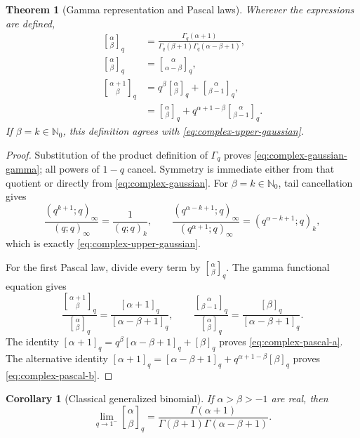 \documentclass[11pt,oneside,openany]{book}
\newtheorem{theorem}{Theorem}[chapter]
\newtheorem{corollary}[corollary]{Corollary}
\theoremstyle{definition}
\theoremstyle{remark}
\newcommand{\N}{\mathbb N}
\begin{document}
\begin{theorem}[Gamma representation and Pascal laws]\label{thm:complex-gaussian-properties}
Wherever the expressions are defined,
\begin{align}
 \genfrac{[}{]}{0pt}{}{\alpha}{\beta}_q
 &=\frac{\Gamma_q(\alpha+1)}
 {\Gamma_q(\beta+1)\Gamma_q(\alpha-\beta+1)},
 \tag{17.9}\label{eq:complex-gaussian-gamma}\\
 \genfrac{[}{]}{0pt}{}{\alpha}{\beta}_q
 &=\genfrac{[}{]}{0pt}{}{\alpha}{\alpha-\beta}_q,
 \tag{17.10}\label{eq:complex-gaussian-symmetry}\\
 \genfrac{[}{]}{0pt}{}{\alpha+1}{\beta}_q
 &=q^\beta\genfrac{[}{]}{0pt}{}{\alpha}{\beta}_q
   +\genfrac{[}{]}{0pt}{}{\alpha}{\beta-1}_q,
 \tag{17.11}\label{eq:complex-pascal-a}\\
 &=\genfrac{[}{]}{0pt}{}{\alpha}{\beta}_q
   +q^{\alpha+1-\beta}
    \genfrac{[}{]}{0pt}{}{\alpha}{\beta-1}_q.
 \tag{17.12}\label{eq:complex-pascal-b}
\end{align}
If $\beta=k\in\N_0$, this definition agrees with \eqref{eq:complex-upper-gaussian}.
\end{theorem}

\begin{proof}
Substitution of the product definition of $\Gamma_q$ proves \eqref{eq:complex-gaussian-gamma}; all powers of $1-q$ cancel.  Symmetry is immediate either from that quotient or directly from \eqref{eq:complex-gaussian}.  For $\beta=k\in\N_0$, tail cancellation gives
\[
 \frac{(q^{k+1};q)_\infty}{(q;q)_\infty}
 =\frac1{(q;q)_k},
 \qquad
 \frac{(q^{\alpha-k+1};q)_\infty}
 {(q^{\alpha+1};q)_\infty}
 =(q^{\alpha-k+1};q)_k,
\]
which is exactly \eqref{eq:complex-upper-gaussian}.

For the first Pascal law, divide every term by
$\genfrac{[}{]}{0pt}{}{\alpha}{\beta}_q$.  The gamma functional equation gives
\[
 \frac{\genfrac{[}{]}{0pt}{}{\alpha+1}{\beta}_q}
      {\genfrac{[}{]}{0pt}{}{\alpha}{\beta}_q}
 =\frac{[\alpha+1]_q}{[\alpha-\beta+1]_q},
 \qquad
 \frac{\genfrac{[}{]}{0pt}{}{\alpha}{\beta-1}_q}
      {\genfrac{[}{]}{0pt}{}{\alpha}{\beta}_q}
 =\frac{[\beta]_q}{[\alpha-\beta+1]_q}.
\]
The identity
\(
 [\alpha+1]_q=q^\beta[\alpha-\beta+1]_q+[\beta]_q
\)
proves \eqref{eq:complex-pascal-a}.  The alternative identity
\(
 [\alpha+1]_q=[\alpha-\beta+1]_q
 +q^{\alpha+1-\beta}[\beta]_q
\)
proves \eqref{eq:complex-pascal-b}.
\end{proof}

\begin{corollary}[Classical generalized binomial]\label{cor:complex-gaussian-classical}
If $\alpha>\beta>-1$ are real, then
\[
 \lim_{q\to1^-}\genfrac{[}{]}{0pt}{}{\alpha}{\beta}_q
 =\frac{\Gamma(\alpha+1)}
 {\Gamma(\beta+1)\Gamma(\alpha-\beta+1)}.
\]
\end{corollary}
\end{document}
